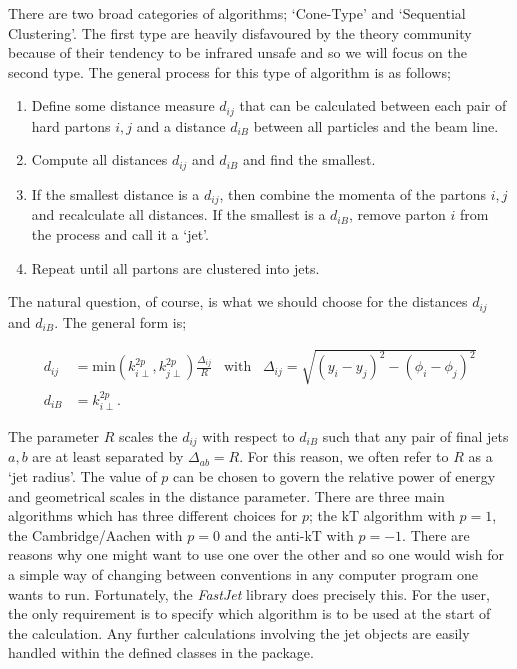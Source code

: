 There are two broad categories of algorithms; `Cone-Type' and `Sequential Clustering'. The first type are heavily disfavoured by the theory community because of their tendency to be infrared unsafe and so we will focus on the second type. The general process for this type of algorithm is as follows;

\begin{enumerate}
\item{Define some distance measure $d_{ij}$ that can be calculated between each pair of hard partons $i,j$ and a distance $d_{iB}$ between all particles and the beam line.}
\item{Compute all distances $d_{ij}$ and $d_{iB}$ and find the smallest.}
\item{If the smallest distance is a $d_{ij}$, then combine the momenta of the partons $i, j$ and recalculate all distances. If the smallest is a $d_{iB}$, remove parton $i$ from the process and call it a `jet'.}
\item{Repeat until all partons are clustered into jets.}
\end{enumerate}

The natural question, of course, is what we should choose for the distances $d_{ij}$ and $d_{iB}$. The general form is;

\begin{equation}
\begin{split}
d_{ij} &= \text{min}\left(k_{i \perp}^{2p},k_{j \perp}^{2p} \right) \frac{\Delta_{ij}}{R} \hspace{10pt} \text{with} \hspace{10pt} \Delta_{ij} = \sqrt{(y_i - y_j)^2 - (\phi_i - \phi_j)^2} \\
d_{iB} &= k_{i \perp}^{2p}.
\end{split}
\end{equation}

The parameter $R$ scales the $d_{ij}$ with respect to $d_{iB}$ such that any pair of final jets $a, b$ are at least separated by $\Delta_{ab} = R$. For this reason, we often refer to $R$ as a `jet radius'. The value of $p$ can be chosen to govern the relative power of energy and geometrical scales in the distance parameter. There are three main algorithms which has three different choices for $p$; the kT algorithm with $p =1$, the Cambridge/Aachen with $p=0$ and the anti-kT with $p = -1$. There are reasons why one might want to use one over the other and so one would wish for a simple way of changing between conventions in any computer program one wants to run. Fortunately, the \emph{FastJet} library \cite{Cacciari2012} does precisely this. For the user, the only requirement is to specify which algorithm is to be used at the start of the calculation. Any further calculations involving the jet objects are easily handled within the defined classes in the package. 

